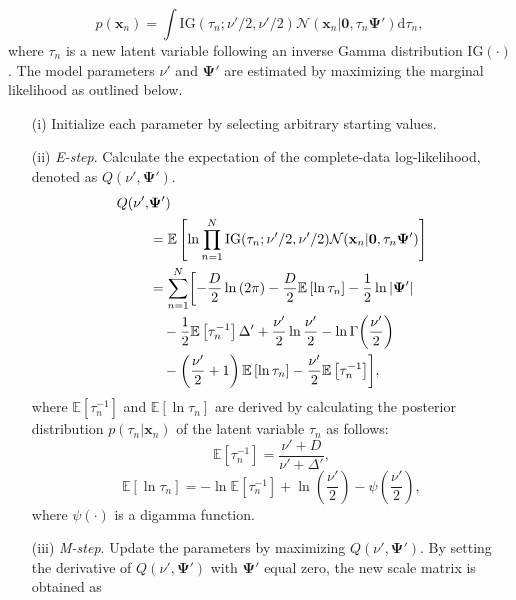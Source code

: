 \documentclass[journal]{IEEEtran}
\begin{document}
\begin{equation}%
\label{eq:eq11}
		p(\mathbf{x}_n) = \int \mathrm{IG}(\tau_n;\nu'/2,\nu'/2) \mathcal{N}(\mathbf{x}_n|\mathbf{0}, \tau_n \mathbf{\Psi}') \mathrm{d}{\tau_n},
\end{equation}
where $\tau_n$ is a new latent variable following an inverse Gamma distribution $\mathrm{IG(\cdot)}$.
The model parameters $\nu'$ and $\mathbf{\Psi}'$ are estimated by maximizing the marginal likelihood as outlined below.

\begin{enumerate}
\setlength{\parskip}{0cm}
\setlength{\itemsep}{0cm}
\item[(i)] Initialize each parameter by selecting arbitrary starting values.
\item[(ii)] \textit{E-step}. Calculate the expectation of the complete-data log-likelihood, denoted as $Q(\nu',\mathbf{\Psi}')$.
\begin{align}%
  Q(\nu',&\mathbf{\Psi}') \notag \\
  &=\mathbb{E} \left[\ln{\prod_{n=1}^{N}\mathrm{IG}(\tau_n;\nu'/2,\nu'/2) \mathcal{N}(\mathbf{x}_n|\mathbf{0}, \tau_n \mathbf{\Psi}')}\right]  \notag  \\
  &=\sum_{n=1}^{N} \biggl[-\frac{D}{2}\ln{(2\pi)}-\frac{D}{2}\mathbb{E}\left[\ln{\tau_n}\right]-\frac{1}{2}\ln{|\mathbf{\Psi}'|} \notag \\
  &\quad-\frac{1}{2}\mathbb{E}\left[\tau^{-1}_n\right]\Delta'+\frac{\nu'}{2} \ln{\frac{\nu'}{2}} - \ln{\Gamma{\left(\frac{\nu'}{2}\right)}} \notag \\
  &\quad- \left(\frac{\nu'}{2}+1\right)\mathbb{E}\left[\ln{\tau_n}\right]-\frac{\nu'}{2}\mathbb{E}\left[\tau^{-1}_n \right] \biggr],
\end{align}
where $\mathbb{E}\left[\tau^{-1}_n\right]$ and $\mathbb{E}\left[\ln{\tau_n}\right]$ are derived by calculating the posterior distribution $p(\tau_n|\mathbf{x}_n)$ of the latent variable $\tau_n$ as follows:
\begin{equation}%
\mathbb{E}\left[\tau^{-1}_n\right]=\frac{\nu'+D}{\nu'+\Delta'},
\end{equation}
\begin{equation}%
\mathbb{E}\left[\ln{\tau_n}\right]=-\ln{\mathbb{E}\left[\tau^{-1}_n\right]}+\ln{\left(\frac{\nu'}{2}\right)}-{\psi}\left(\frac{\nu'}{2}\right),
\end{equation}
where $\psi(\cdot)$ is a digamma function.
\item[(iii)] \textit{M-step}. Update the parameters by maximizing $Q(\nu',\mathbf{\Psi}')$.
By setting the derivative of $Q(\nu',\mathbf{\Psi}')$ with $\mathbf{\Psi}'$ equal zero, the new scale matrix is obtained as


\end{enumerate}
\end{document}
